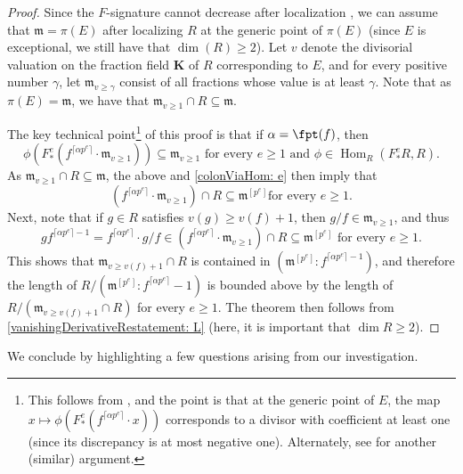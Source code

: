 \documentclass[11pt]{amsart}
\begin{document}
\begin{proof}
Since the $F$-signature cannot decrease after localization \cite[Proposition 1.3]{AberbachLeuschke}, we can assume that ${\mathfrak{m}} = \pi(E)$ after localizing $R$ at the generic point of $\pi(E)$ (since $E$ is exceptional, we still have that $\dim(R) \geq 2$).  Let $v$ denote the divisorial valuation on the fraction field $\mathbf{K}$ of $R$ corresponding to $E$, and for every positive number $\gamma$, let  ${\mathfrak{m}}_{v \geq \gamma}$ consist of all fractions whose value is at least $\gamma$.  Note that as $\pi(E) = {\mathfrak{m}}$, we have that ${\mathfrak{m}}_{v \geq 1} \cap R \subseteq {\mathfrak{m}}$.

The key technical point\footnote{This follows from \cite[Section 7.2]{BlickleSchwedeSurveyPMinusE}, and the point is that at the generic point of $E$, the map $x \mapsto \phi\left(F^e_* (f^{\lceil \alpha p^e \rceil} \cdot x)\right)$ corresponds to a divisor with coefficient at least one (since its discrepancy is at most negative one).  Alternately, see \cite[Section 6]{BlickleSchwedeTuckerTestIdeals2} for another (similar) argument.}
 of this proof is that if $\alpha = \fpt(f)$, then
\[ \phi \left( F^e_{\ast} (f^{\lceil \alpha p^e \rceil} \cdot {\mathfrak{m}}_{v \geq 1}) \right) \subseteq {\mathfrak{m}}_{v \geq 1} \text{ for every $e \geq 1$ and $\phi \in \operatorname{Hom}_R(F^e_{\ast} R, R)$.}
\]
As ${\mathfrak{m}}_{v \geq 1} \cap R \subseteq {\mathfrak{m}}$,  the above and \eqref{colonViaHom: e} then imply that
\[ (f^{\lceil \alpha p^e \rceil} \cdot {\mathfrak{m}}_{v \geq 1} ) \cap R \subseteq {\mathfrak{m}}^{[p^e]} \text {for every $e \geq 1$}.\]
Next, note that if $g \in R$ satisfies $v(g) \geq v(f) + 1$,  then $g/f \in {\mathfrak{m}}_{v \geq 1}$, and thus
\[ g f^{\lceil \alpha p^e \rceil-1} = f^{\lceil \alpha p^e \rceil} \cdot g/f \in (f^{\lceil \alpha p^e \rceil} \cdot {\mathfrak{m}}_{v \geq 1} ) \cap R \subseteq {\mathfrak{m}}^{[p^e]} \text{ for every $e \geq 1$}. \]
This shows that ${\mathfrak{m}}_{v \geq v(f) + 1} \cap R$ is contained in $( {\mathfrak{m}}^{[p^e]} : f^{ \lceil \alpha  p^e \rceil-1})$, and therefore the length of $R/({\mathfrak{m}}^{[p^e]} : f^{\lceil \alpha p^e \rceil}-1)$ is bounded above by the length of $R/( {\mathfrak{m}}_{v \geq v(f) + 1} \cap R)$ for every $e \geq 1$.  The theorem then follows from \autoref{vanishingDerivativeRestatement: L} (here, it is important that $\dim R \geq 2$).
\end{proof}

We conclude by highlighting a few questions arising from our investigation.
\end{document}
